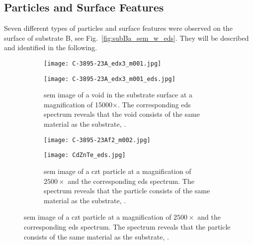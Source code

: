 \subsection{Particles and Surface Features}
Seven different types of particles and surface features were observed on the surface of substrate B, see Fig.~\ref{fig:subBa_sem_w_eds}. They will be described and identified in the following.

\begin{figure}[htbp]
    \centering
    \begin{subfigure}[t]{\textwidth}
          \begin{minipage}[t]{0.48\linewidth}
            \centering
            \texttt{[image: C-3895-23A\_edx3\_m001.jpg]}
          \end{minipage}
          \hfill
          \begin{minipage}[t]{0.48\linewidth}
            \centering
            \texttt{[image: C-3895-23A\_edx3\_m001\_eds.jpg]}
          \end{minipage}
        \caption{\ac{sem} image of a void in the substrate surface at a magnification of 15000$\times$. The corresponding \ac{eds} spectrum reveals that the void consists of the same material as the substrate, .}\label{fig:SEM_C389523_void_eds}
    \end{subfigure}%
    \par\bigskip
    \begin{subfigure}[t]{\textwidth}
          \begin{minipage}[t]{0.48\linewidth}
            \centering
            \texttt{[image: C-3895-23Af2\_m002.jpg]}
          \end{minipage}
          \hfill
          \begin{minipage}[t]{0.49\linewidth}
            \centering
            \texttt{[image: CdZnTe\_eds.jpg]}
          \end{minipage}
        \caption{\Ac{sem} image of a \ac{czt} particle at a magnification of $2500\times$ and the corresponding \ac{eds} spectrum. The spectrum reveals that the particle consists of the same material as the substrate, .}\label{fig:SEM_B_particulates_eds}

\end{subfigure}
\end{figure}
